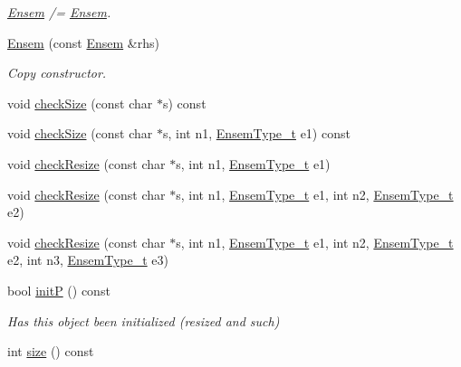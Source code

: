 \begin{DoxyCompactItemize}
\begin{DoxyCompactList}\small\item\em \mbox{\hyperlink{classENSEM_1_1Ensem}{Ensem}} /= \mbox{\hyperlink{classENSEM_1_1Ensem}{Ensem}}. \end{DoxyCompactList}\item 
\mbox{\hyperlink{classENSEM_1_1Ensem_a5e80cf6ad71f96ba2fa28cac27f06003}{Ensem}} (const \mbox{\hyperlink{classENSEM_1_1Ensem}{Ensem}} \&rhs)
\begin{DoxyCompactList}\small\item\em Copy constructor. \end{DoxyCompactList}\item 
void \mbox{\hyperlink{classENSEM_1_1Ensem_a32978c0e251d9731bdb83c6069eb059d}{check\+Size}} (const char $\ast$s) const
\item 
void \mbox{\hyperlink{classENSEM_1_1Ensem_a4c06fadea7b637572de2347739b78004}{check\+Size}} (const char $\ast$s, int n1, \mbox{\hyperlink{namespaceENSEM_a2dc2c4a26884f343471e52f23479ddbe}{Ensem\+Type\+\_\+t}} e1) const
\item 
void \mbox{\hyperlink{classENSEM_1_1Ensem_a1cebe5f8cc3d849d6b4dc7d9d10c636b}{check\+Resize}} (const char $\ast$s, int n1, \mbox{\hyperlink{namespaceENSEM_a2dc2c4a26884f343471e52f23479ddbe}{Ensem\+Type\+\_\+t}} e1)
\item 
void \mbox{\hyperlink{classENSEM_1_1Ensem_acb139b6e03db52a9190de9ea4830addb}{check\+Resize}} (const char $\ast$s, int n1, \mbox{\hyperlink{namespaceENSEM_a2dc2c4a26884f343471e52f23479ddbe}{Ensem\+Type\+\_\+t}} e1, int n2, \mbox{\hyperlink{namespaceENSEM_a2dc2c4a26884f343471e52f23479ddbe}{Ensem\+Type\+\_\+t}} e2)
\item 
void \mbox{\hyperlink{classENSEM_1_1Ensem_a893d2925ef3c942b9d25b0a6e6db619c}{check\+Resize}} (const char $\ast$s, int n1, \mbox{\hyperlink{namespaceENSEM_a2dc2c4a26884f343471e52f23479ddbe}{Ensem\+Type\+\_\+t}} e1, int n2, \mbox{\hyperlink{namespaceENSEM_a2dc2c4a26884f343471e52f23479ddbe}{Ensem\+Type\+\_\+t}} e2, int n3, \mbox{\hyperlink{namespaceENSEM_a2dc2c4a26884f343471e52f23479ddbe}{Ensem\+Type\+\_\+t}} e3)
\item 
bool \mbox{\hyperlink{classENSEM_1_1Ensem_af76aaa7b0f354006786dce06dc04669d}{initP}} () const
\begin{DoxyCompactList}\small\item\em Has this object been initialized (resized and such) \end{DoxyCompactList}\item 
int \mbox{\hyperlink{classENSEM_1_1Ensem_ae8cf08459492240dcab13d4ab3a21216}{size}} () const

\end{DoxyCompactItemize}

